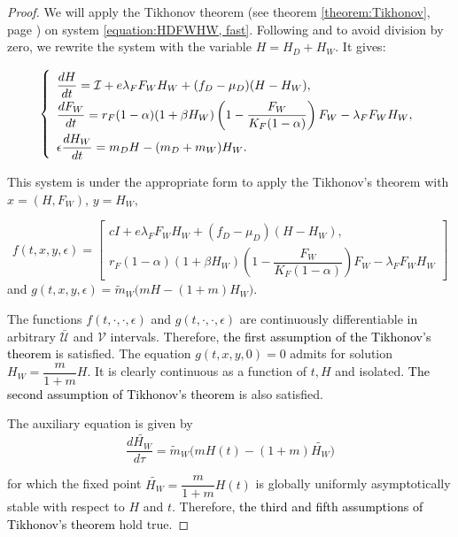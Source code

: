 \documentclass{article}
\newcommand{\lfw}{\lambda_{F}}
\newcommand{\lfw}{\lambda_{F}}
\newcommand{\cI}{\mathcal{I}}
\newcommand{\mW}{\tilde{m}_W}
\newcommand{\vdeux}[1]{\textcolor{black}{#1}}
\theoremstyle{definition}
\theoremstyle{remark}
\begin{document}
\begin{proof}
We will apply the Tikhonov theorem (see theorem \ref{theorem:Tikhonov}, page \pageref{theorem:Tikhonov}) on system \eqref{equation:HDFWHW, fast}. Following \cite{banasiak_methods_2014} and to avoid division by zero, we rewrite the system with the variable $H = H_D + H_W$. It gives:

\begin{equation*} 
\def\arraystretch{2}
\left\{ 
\begin{array}{l}
\dfrac{dH}{dt}= \cI + e\lfw F_WH_W + (f_D - \mu_D)(H - H_W), \\
\dfrac{dF_W}{dt} = r_F(1- \alpha) (1+ \beta H_W) \left(1 - \dfrac{F_W}{K_F(1-\alpha)} \right) F_W - \lfw F_W H_W, \\
\epsilon \dfrac{dH_W}{dt}= m_D H - (m_D + m_W) H_W.
\end{array} \right.
\label{equation:HFWHW} 
\end{equation*}

This system 
is under the appropriate form to apply the Tikhonov's theorem with $x = (H, F_W)$, $y = H_W$,  

$$f(t,x,y,\epsilon) = \begin{bmatrix}
cI + e\lfw F_W H_W + (f_D - \mu_D) (H - H_W), \\
r_F(1- \alpha) (1+ \beta H_W) \left(1 - \dfrac{F_W}{K_F(1-\alpha)} \right) F_W - \lfw F_W H_W
\end{bmatrix}  $$
and $g(t,x,y,\epsilon) = \mW \Big(m H - (1 + m)H_W \Big) $.

The functions $f(t, \cdot, \cdot, \epsilon)$ and $g(t, \cdot, \cdot, \epsilon)$ are continuously differentiable in arbitrary $\mathcal{\bar{U}}$ and $\mathcal{V}$ intervals. Therefore, \vdeux{the first assumption of the Tikhonov's theorem} is satisfied. The equation $ g(t,x,y,0) =  0$ admits for solution $H_W = \dfrac{m}{1+m}H$. It is clearly continuous as a function of $t, H$ and isolated. \vdeux{The second assumption of Tikhonov's theorem} is also satisfied.

The auxiliary equation is given by
\begin{equation*}
\dfrac{d \tilde{H_W}}{d \tau} = \mW \Big(m H(t) - (1 + m)\tilde{H_W} \Big)
\end{equation*}

for which the fixed point $\tilde{H_W} = \dfrac{m}{1+m}H(t)$ is globally uniformly asymptotically stable with respect to $H$ and $t$. Therefore, \vdeux{the third and fifth assumptions of Tikhonov's theorem} hold true.


\end{proof}
\end{document}
